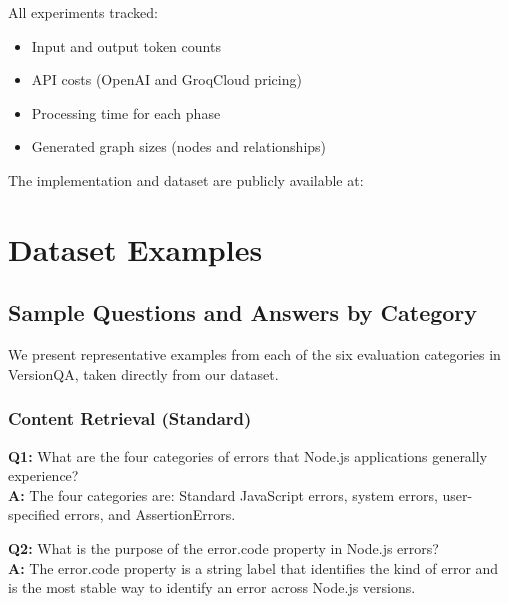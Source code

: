 All experiments tracked:
\begin{itemize}
    \item Input and output token counts
    \item API costs (OpenAI and GroqCloud pricing)
    \item Processing time for each phase
    \item Generated graph sizes (nodes and relationships)
\end{itemize}

The implementation and dataset are publicly available at: \githuburl

























\newpage

\section{Dataset Examples}

\subsection{Sample Questions and Answers by Category}

We present representative examples from each of the six evaluation categories in VersionQA, taken directly from our dataset.

\subsubsection{Content Retrieval (Standard)}

\textbf{Q1:} What are the four categories of errors that Node.js applications generally experience?\\
\textbf{A:} The four categories are: Standard JavaScript errors, system errors, user-specified errors, and AssertionErrors.

\textbf{Q2:} What is the purpose of the error.code property in Node.js errors?\\
\textbf{A:} The error.code property is a string label that identifies the kind of error and is the most stable way to identify an error across Node.js versions.

